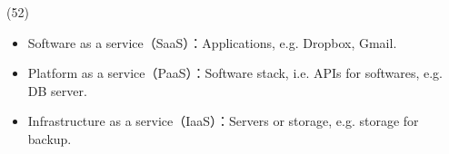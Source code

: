 \item \begin{theorem}{(52)} \quad\quad \begin{itemize}
        \item Software as a service（SaaS）：Applications, e.g. Dropbox, Gmail.
        \item Platform as a service（PaaS）：Software stack, i.e. APIs for softwares, e.g. DB server.
        \item Infrastructure as a service（IaaS）：Servers or storage, e.g. storage for backup.
    \end{itemize}
\end{theorem}

